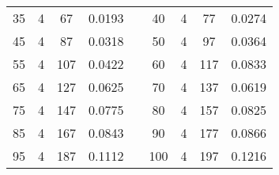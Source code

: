 \documentclass[a4paper, 12pt, french,oneside]{book}
\begin{document}
\begin{table}[!ht]
\begin{tabularx}{\linewidth}{|c|c|c|c|X|c|c|c|c|}
        35           & 4            & 67              & 0.0193                        &  &

        40           & 4            & 77              & 0.0274                                                                                                           \\

        45           & 4            & 87              & 0.0318                        &  &

        50           & 4            & 97              & 0.0364                                                                                                           \\

        55           & 4            & 107             & 0.0422                        &  &

        60           & 4            & 117             & 0.0833                                                                                                           \\

        65           & 4            & 127             & 0.0625                        &  &

        70           & 4            & 137             & 0.0619                                                                                                           \\

        75           & 4            & 147             & 0.0775                        &  &

        80           & 4            & 157             & 0.0825                                                                                                           \\

        85           & 4            & 167             & 0.0843                        &  &

        90           & 4            & 177             & 0.0866                                                                                                           \\

        95           & 4            & 187             & 0.1112                        &  &

        100          & 4            & 197             & 0.1216                                                                                                           \\


\end{tabularx}
\end{table}
\end{document}
